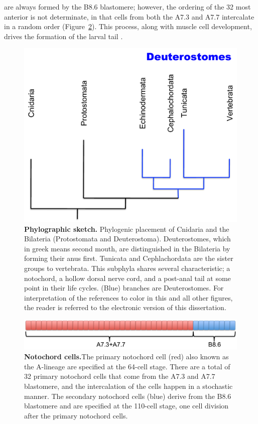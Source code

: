 are always formed by the B8.6 blastomere; however, the ordering of the 32 most anterior is not determinate, in that cells from both the A7.3 and A7.7 intercalate in a random order (Figure~\ref{fig:noto_cells})\cite{nishida_cell_1983,nishida_cell_1985,miyamoto_formation_1985, swalla_mechanisms_1993,kourakis_one-dimensional_2014}. This process, along with muscle cell development, drives the formation of the larval tail \cite{miyamoto_formation_1985, jeffery_factors_1992,swalla_mechanisms_1993}.
\begin{figure}[tbp]
\centering
\includegraphics[scale=0.5]{figures/phylogeny.pdf}
\caption{\textbf{Phylographic sketch.} Phylogenic placement of Cnidaria and the Bilateria (Protostomata and Deuterostoma). Deuterostomes, which in greek means second mouth, are distinguished in the Bilateria by forming their anus first. Tunicata and Cephlachordata are the sister groups to vertebrata. This subphyla shares several characteristic; a notochord, a hollow dorsal nerve cord, and a post-anal tail at some point in their life cycles. (Blue) branches are Deuterostomes. For interpretation of the references to color in this and all other figures, the reader is referred to the electronic version of this dissertation.}
\label{fig:noto_cells}
\end{figure}

\begin{figure}[thbp]
\centering
\includegraphics[scale=0.5]{figures/noto_cells.pdf}
\caption{\textbf{Notochord cells.}The primary notochord cell (red) also known as the A-lineage are specified at the 64-cell stage. There are a total of 32 primary notochord cells that come from the A7.3 and A7.7 blastomere, and the intercalation of the cells happen in a stochastic manner. The secondary notochord cells (blue) derive from the B8.6 blastomere and are specified at the 110-cell stage, one cell division after the primary notochord cells.}
\label{fig:noto_cells}
\end{figure}

